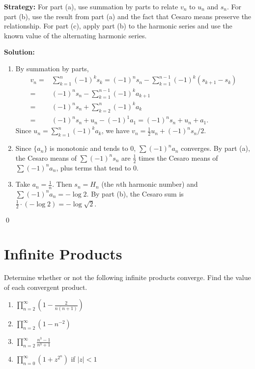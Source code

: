 \noindent\textbf{Strategy:} For part (a), use summation by parts to relate \(v_n\) to \(u_n\) and \(s_n\). For part (b), use the result from part (a) and the fact that Cesaro means preserve the relationship. For part (c), apply part (b) to the harmonic series and use the known value of the alternating harmonic series.

\bigskip\noindent\textbf{Solution:}
\begin{enumerate}[label=(\alph*)]
\item By summation by parts, 
\begin{align*}
v_n =& \sum_{k=1}^n (-1)^k s_k = (-1)^n s_n - \sum_{k=1}^{n-1} (-1)^k (s_{k+1} - s_k) \\
=& (-1)^n s_n - \sum_{k=1}^{n-1} (-1)^k a_{k+1} \\
=& (-1)^n s_n + \sum_{k=2}^n (-1)^k a_k \\
=& (-1)^n s_n + u_n - (-1)^1 a_1 = (-1)^n s_n + u_n + a_1.
\end{align*}
Since \(u_n = \sum_{k=1}^n (-1)^k a_k\), we have \(v_n = \frac{1}{2} u_n + (-1)^n s_n / 2\).

\item Since \(\{a_n\}\) is monotonic and tends to 0, \(\sum (-1)^n a_n\) converges. By part (a), the Cesaro means of \(\sum (-1)^n s_n\) are \(\frac{1}{2}\) times the Cesaro means of \(\sum (-1)^n a_n\), plus terms that tend to 0.

\item Take \(a_n = \frac{1}{n}\). Then \(s_n = H_n\) (the \(n\)th harmonic number) and \(\sum (-1)^n a_n = -\log 2\). By part (b), the Cesaro sum is \(\frac{1}{2} \cdot (-\log 2) = -\log \sqrt{2}\).
\end{enumerate}\qed

\section{Infinite Products}



\begin{problembox}
Determine whether or not the following infinite products converge. Find the value of each convergent product.
\begin{enumerate}[label=\alph*)]
\item \(\prod_{n=2}^{\infty} \left( 1 - \frac{2}{n(n+1)} \right)\)
\item \(\prod_{n=2}^{\infty} (1 - n^{-2})\)
\item \(\prod_{n=2}^{\infty} \frac{n^3 - 1}{n^3 + 1}\)
\item \(\prod_{n=0}^{\infty} (1 + z^{2^n})\) if \(|z| < 1\)
\end{enumerate}
\end{problembox}


